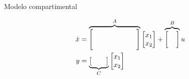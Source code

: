 \documentclass[presentation,aspectratio=169]{beamer}
\begin{document}
\begin{frame}[label={sec:org9d1e36f}]{Modelo compartimental}
\begin{center}
\Large
\begin{align*}
  \dot{x} &= \overbrace{\begin{bmatrix} \textcolor{white}{-\frac{Q+Q_o}{V_1}}  & \textcolor{white}{\frac{Q}{V_1}}\\
              \textcolor{white}{\frac{Q}{V_2}}  & \textcolor{white}{-\frac{Q}{V_2}}\end{bmatrix}}^A \begin{bmatrix} {x_1}\\ {x_2}\end{bmatrix}  + \overbrace{\begin{bmatrix} \textcolor{white}{\frac{1}{V_1}} \\ \textcolor{white}{0} \end{bmatrix}}^B  u \\
       y &=  \underbrace{\begin{bmatrix} \textcolor{white}{1} &  \textcolor{white}{0}\end{bmatrix}}_C \begin{bmatrix} x_1\\ x_2\end{bmatrix}
\end{align*}

\end{center}
\end{frame}
\end{document}
